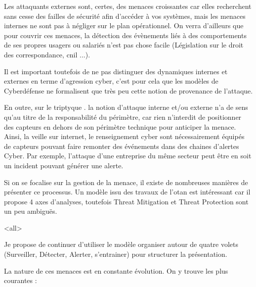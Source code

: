 Les attaquants externes sont, certes, des menaces croissantes car elles recherchent sans cesse des failles de sécurité afin d’accéder à vos systèmes, mais les menaces internes ne sont  pas à négliger sur le plan opérationnel. On verra d'ailleurs que pour couvrir ces menaces, la détection des évènements liés à des comportements de ses propres usagers ou salariés n'est pas chose facile (Législation sur le droit des correspondance, \gls{cnil} ...).

Il est important toutefois de ne pas distinguer des dynamiques internes et externes en terme d'agression cyber, c'est pour cela que les modèles de Cyberdéfense ne formalisent que très peu cette notion de provenance de l'attaque.

En outre, sur le triptyque  . la notion d'attaque interne et/ou externe n'a de sens qu'au titre de la responsabilité du périmètre, car rien n'interdit de positionner des capteurs en dehors de son périmètre technique pour anticiper la menace. Ainsi, la veille sur internet, le renseignement cyber sont nécessairement équipés de capteurs pouvant faire remonter des événements dans des chaines d'alertes Cyber.
Par exemple, l'attaque d'une entreprise du même secteur peut être  en soit un incident pouvant générer une alerte.

Si on se focalise sur la gestion de la menace, il existe de nombreuses manières de présenter ce processus. Un modèle  issu des travaux de l'\gls{otan} est intéressant car il propose 4 axes d'analyses, toutefois Threat Mitigation et Threat Protection sont un peu ambiguës.


\mode<all>{}

Je propose de continuer d'utiliser le modèle organiser autour de quatre volets (Surveiller, Détecter, Alerter, s'entrainer)   pour structurer la présentation.


La nature de ces menaces est en constante évolution.  On y trouve les plus courantes :

